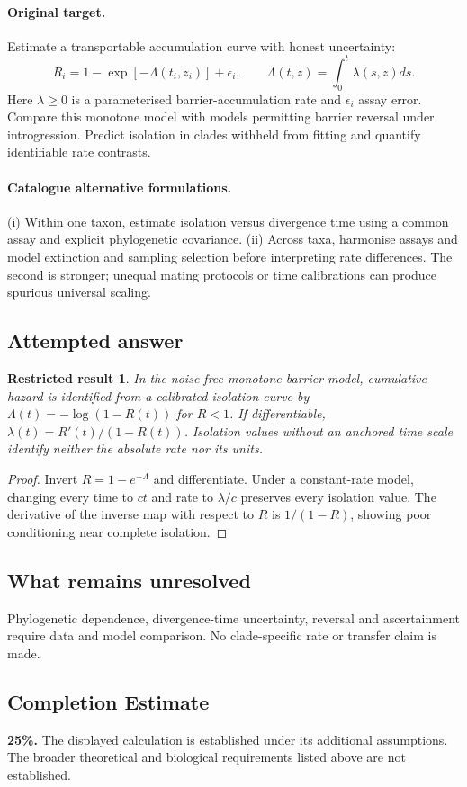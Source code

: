 \documentclass[11pt]{article}
\newtheorem{attemptresult}{Restricted result}[section]
\begin{document}
\paragraph{Original target.}
Estimate a transportable accumulation curve with honest uncertainty:
\[
R_i=1-\exp[-\Lambda(t_i,z_i)]+\epsilon_i,
\qquad
\Lambda(t,z)=\int_0^t\lambda(s,z)ds.
\]
Here $\lambda\geq0$ is a parameterised barrier-accumulation rate and $\epsilon_i$ assay error. Compare this monotone model with models permitting barrier reversal under introgression. Predict isolation in clades withheld from fitting and quantify identifiable rate contrasts.
\paragraph{Catalogue alternative formulations.}
(i) Within one taxon, estimate isolation versus divergence time using a common assay and explicit phylogenetic covariance. (ii) Across taxa, harmonise assays and model extinction and sampling selection before interpreting rate differences. The second is stronger; unequal mating protocols or time calibrations can produce spurious universal scaling.
\subsection{Attempted answer}
\begin{attemptresult}
In the noise-free monotone barrier model, cumulative hazard is identified from a calibrated isolation curve by $\Lambda(t)=-\log(1-R(t))$ for $R<1$. If differentiable, $\lambda(t)=R\prime(t)/(1-R(t))$. Isolation values without an anchored time scale identify neither the absolute rate nor its units.
\end{attemptresult}
\begin{proof}
Invert $R=1-e^{-\Lambda}$ and differentiate. Under a constant-rate model, changing every time to $ct$ and rate to $\lambda/c$ preserves every isolation value. The derivative of the inverse map with respect to $R$ is $1/(1-R)$, showing poor conditioning near complete isolation.
\end{proof}
\subsection{What remains unresolved}
Phylogenetic dependence, divergence-time uncertainty, reversal and ascertainment require data and model comparison. No clade-specific rate or transfer claim is made.
\subsection{Completion Estimate}
\textbf{25\%.} The displayed calculation is established under its additional assumptions. The broader theoretical and biological requirements listed above are not established.
\end{document}
